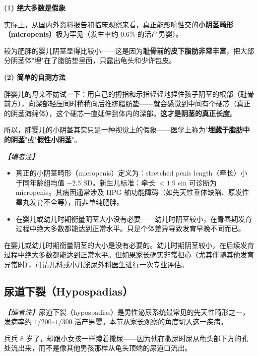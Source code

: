 \vspace{0.5em}
\noindent\textbf{(1) 绝大多数是假象}

实际上，从国内外资料报告和临床观察来看，真正能影响性交的\textbf{小阴茎畸形（micropenis）}极为罕见（发生率约 $0.6\%$ 的活产男婴）。

较为肥胖的婴儿阴茎显得比较小——这是因为\textbf{耻骨前的皮下脂肪非常丰富}，把大部分阴茎体"埋"在了脂肪垫里面，只露出龟头和少许包皮。

\vspace{0.3em}
\noindent\textbf{(2) 简单的自测方法}

胖婴儿的母亲不妨试一下：用自己的拇指和示指轻轻地捏住孩子阴茎的根部（耻骨前方），向深部轻压同时稍稍向后推挤脂肪垫——就会感觉到中间有个硬芯（真正的阴茎海绵体），这个硬芯一直延伸到体内的深部。\textbf{这才是阴茎的真正长度}。

所以，胖婴儿的小阴茎其实只是一种视觉上的假象——医学上称为"\textbf{埋藏于脂肪中的阴茎}"或"\textbf{假性小阴茎}"。

\vspace{0.3em}
\noindent\textit{【编者注】}
\begin{itemize}
	\item 真正的小阴茎畸形（micropenis）定义为：stretched penis length（牵长）小于同年龄组均值 $-2.5$ SD。新生儿标准：牵长 $< 1.9$ cm 可诊断为 micropenis。其病因通常涉及 HPG 轴功能障碍（如先天性垂体缺陷、原发性睾丸发育不全等），而非单纯肥胖。
	\item 在婴儿或幼儿时期衡量阴茎大小没有必要——幼儿时阴茎较小，在青春期发育过程中绝大多数都能达到正常水平。只是个体差异导致发育早晚不同而已。
\end{itemize}

\begin{tcolorbox}[colback=pink!5!white,colframe=red!50!black,title=贴心小叮咛]
在婴儿或幼儿时期衡量阴茎的大小是没有必要的。幼儿时期阴茎较小，在后续发育过程中绝大多数都能达到正常水平。但如果家长确实非常担心（尤其伴随其他发育异常时），可请儿科或小儿泌尿外科医生进行一次专业评估。
\end{tcolorbox}

\subsection{尿道下裂（Hypospadias）}

\noindent\textit{【编者注】}尿道下裂（hypospadias）是男性泌尿系统最常见的先天性畸形之一，发病率约 $1/200$--$1/300$ 活产男婴。本节从家长观察的角度切入这一疾病。

\vspace{0.5em}
兵兵 $8$ 岁了，却跟小女孩一样蹲着撒尿——因为他在撒尿时尿从龟头部下方的孔处流出来，而不是像其他男孩那样从龟头顶端的尿道口流出。

